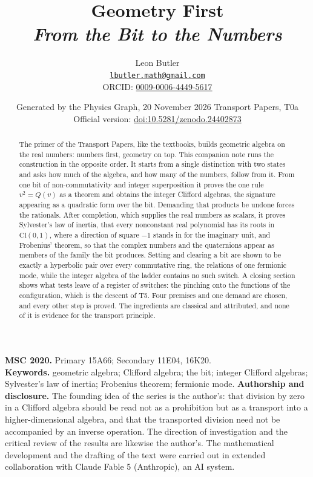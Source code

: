 \documentclass[11pt]{article}
\title{\bfseries Geometry First\\[4pt]\large\itshape From the Bit to the Numbers}
\author{Leon Butler\\ \normalsize\href{mailto:lbutler.math@gmail.com}{\texttt{lbutler.math@gmail.com}}\\ \normalsize ORCID: \href{https://orcid.org/0009-0006-4449-5617}{0009-0006-4449-5617}}
\date{Generated by the Physics Graph, 20 November 2026 \textperiodcentered{} Transport Papers, T0a\\[3pt]\small Official version: \href{https://doi.org/10.5281/zenodo.24402873}{doi:10.5281/zenodo.24402873}}
\theoremstyle{definition}
\theoremstyle{plain}
\providecommand{\Cl}{}\renewcommand{\Cl}{\mathrm{Cl}}
\begin{document}
\maketitle
\begin{abstract}
\normalsize
The primer of the Transport Papers, like the textbooks, builds geometric algebra on the real numbers: numbers first, geometry on top. This companion note runs the construction in the opposite order. It starts from a single distinction with two states and asks how much of the algebra, and how many of the numbers, follow from it. From one bit of non-commutativity and integer superposition it proves the one rule $v^{2} = Q(v)$ as a theorem and obtains the integer Clifford algebras, the signature appearing as a quadratic form over the bit. Demanding that products be undone forces the rationals. After completion, which supplies the real numbers as scalars, it proves Sylvester's law of inertia, that every nonconstant real polynomial has its roots in $\Cl(0,1)$, where a direction of square $-1$ stands in for the imaginary unit, and Frobenius' theorem, so that the complex numbers and the quaternions appear as members of the family the bit produces. Setting and clearing a bit are shown to be exactly a hyperbolic pair over every commutative ring, the relations of one fermionic mode, while the integer algebra of the ladder contains no such switch. A closing section shows what tests leave of a register of switches: the pinching onto the functions of the configuration, which is the descent of T5. Four premises and one demand are chosen, and every other step is proved. The ingredients are classical and attributed, and none of it is evidence for the transport principle.
\end{abstract}
\medskip
\noindent\textbf{MSC 2020.} Primary 15A66; Secondary 11E04, 16K20.\\
\textbf{Keywords.} geometric algebra; Clifford algebra; the bit; integer Clifford algebras; Sylvester's law of inertia; Frobenius theorem; fermionic mode.
\newpage
\noindent \textbf{Authorship and disclosure. }The founding idea of the series is the author's: that division by zero in a Clifford algebra should be read not as a prohibition but as a transport into a higher-dimensional algebra, and that the transported division need not be accompanied by an inverse operation. The direction of investigation and the critical review of the results are likewise the author's. The mathematical development and the drafting of the text were carried out in extended collaboration with Claude Fable 5 (Anthropic), an AI system.
\end{document}

